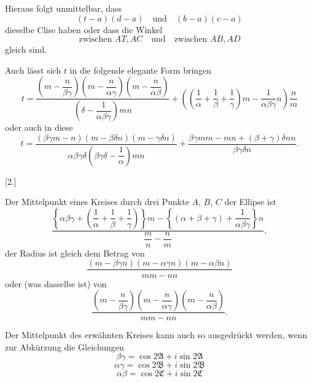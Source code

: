 
Hieraus folgt unmittelbar, dass
\[
(t-a)(d-a) \quad \text{und} \quad (b-a)(c-a)
\]
dieselbe Clise haben oder dass die Winkel
\[
\text{zwischen } AT, AC \quad \text{und} \quad \text{zwischen } AB, AD
\]
gleich sind.

Auch lässt sich $t$ in die folgende elegante Form bringen
\[
t = \dfrac{\left(m-\dfrac{n}{\beta\gamma}\right)
  \left(m-\dfrac{n}{\alpha\gamma}\right)
  \left(m-\dfrac{n}{\alpha\beta}\right)}
  {\left(\delta - \dfrac{1}{\alpha\beta\gamma}\right) m n}
  + \left(\left(\dfrac{1}{\alpha}+\dfrac{1}{\beta}+\dfrac{1}{\gamma}\right) m
  - \dfrac{1}{\alpha\beta\gamma} n\right) \dfrac{n}{m}
\]
oder auch in diese
\[
t = \dfrac{(\beta\gamma m - n)(m - \beta\delta n)(m-\gamma\delta n)}
  {\alpha\beta\gamma\delta\left(\beta\gamma\delta - \dfrac{1}{\alpha}\right) m n}
  + \dfrac{\beta\gamma m m - m n + (\beta+\gamma)\delta n n}{\beta\gamma\delta n}.
\]

\begin{center}
[2.]
\end{center}

Der Mittelpunkt eines Kreises durch drei Punkte $A$, $B$, $C$ der Ellipse
ist
\[
\dfrac{\left\{\alpha\beta\gamma +
  \left(\dfrac{1}{\alpha}+\dfrac{1}{\beta}+\dfrac{1}{\gamma}\right)\right\} m
  - \left\{(\alpha+\beta+\gamma) + \dfrac{1}{\alpha\beta\gamma}\right\} n}
  {\dfrac{m}{n} - \dfrac{n}{m}},
\]
der Radius ist gleich dem Betrag von \[
\dfrac{(m-\beta\gamma n)(m-\alpha\gamma n)(m-\alpha\beta n)}{mm - nn}
\]
oder (was dasselbe ist) von
\[
\dfrac{\left(m-\dfrac{n}{\beta\gamma}\right)\left(m-\dfrac{n}{\alpha\gamma}\right)
  \left(m-\dfrac{n}{\alpha\beta}\right)}{mm-nn}.
\]

Der Mittelpunkt des erwähnten Kreises kann auch so ausgedrückt werden, wenn zur
Abkürzung die Gleichungen
\[
\beta\gamma = \cos 2\mathfrak{A} + i\sin 2\mathfrak{A}
\]
\[
\alpha\gamma = \cos 2\mathfrak{B} + i\sin 2\mathfrak{B}
\]
\[
\alpha\beta = \cos 2\mathfrak{C} + i\sin 2\mathfrak{C}
\]%
